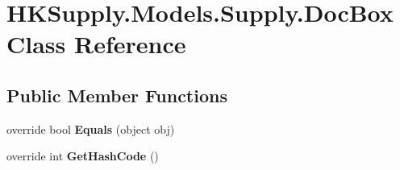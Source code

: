 \hypertarget{class_h_k_supply_1_1_models_1_1_supply_1_1_doc_box}{}\section{H\+K\+Supply.\+Models.\+Supply.\+Doc\+Box Class Reference}
\label{class_h_k_supply_1_1_models_1_1_supply_1_1_doc_box}
\subsection*{Public Member Functions}
\begin{DoxyCompactItemize}
\item 
\mbox{\label{class_h_k_supply_1_1_models_1_1_supply_1_1_doc_box_ab7672c250081466820debb79087992aa}} 
override bool {\bfseries Equals} (object obj)
\item 
\mbox{\label{class_h_k_supply_1_1_models_1_1_supply_1_1_doc_box_affca84d3b78b9f852967db941e013263}} 
override int {\bfseries Get\+Hash\+Code} ()
\end{DoxyCompactItemize}
